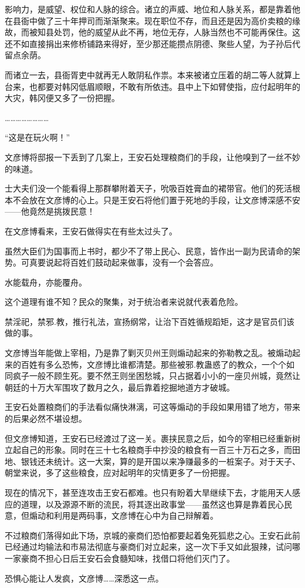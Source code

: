 影响力，是威望、权位和人脉的综合。诸立的声威、地位和人脉关系，都是靠着他在县衙中做了三十年押司而渐渐聚来。现在职位不存，而且还是因为高价卖粮的缘故，而被知县处罚，他的威望从此不再，地位无存，人脉当然也不可能再保住。这还不如直接捐出来修桥铺路来得好，至少那还能攒点阴德、聚些人望，为子孙后代留点余荫。

而诸立一去，县衙胥吏中就再无人敢阴私作祟。本来被诸立压着的胡二等人就算上台来，也都要对韩冈低眉顺眼，不敢有所依违。县中上下如臂使指，应付起明年的大灾，韩冈便又多了一份把握。

……………………

“这是在玩火啊！”

文彦博将邸报一下丢到了几案上，王安石处理粮商们的手段，让他嗅到了一丝不妙的味道。

士大夫们没一个能看得上那群攀附着天子，吮吸百姓膏血的裙带官。他们的死活根本不会放在文彦博的心上。只是王安石将他们置于死地的手段，让文彦博深感不安——他竟然是挑拨民意！

在文彦博看来，王安石做得实在有些太过头了。

虽然大臣们为国事而上书时，都少不了带上民心、民意，皆作出一副为民请命的架势。可真要说起将百姓们鼓动起来做事，没有一个会答应。

水能载舟，亦能覆舟。

这个道理有谁不知？民众的聚集，对于统治者来说就代表着危险。

禁淫祀，禁邪.教，推行礼法，宣扬纲常，让治下百姓循规蹈矩，这才是官员们该做的事。

文彦博当年能做上宰相，乃是靠了剿灭贝州王则煽动起来的弥勒教之乱。被煽动起来的百姓有多么恐怖，文彦博比谁都清楚。那些被邪.教蛊惑了的教众，一个个如同疯子一般不顾生死。要不然王则坐困愁城，只占据着小小的一座贝州城，竟然让朝廷的十万大军围攻了数月之久，最后靠着挖掘地道方才破城。

王安石处置粮商们的手法看似痛快淋漓，可这等煽动的手段如果用错了地方，带来的后果必然不堪设想。

但文彦博知道，王安石已经渡过了这一关。裹挟民意之后，如今的宰相已经重新树立起自己的形象。同时在三十七名粮商手中抄没的粮食有一百三十万石之多，而田地、银钱还未统计。这一大案，算的是开国以来净赚最多的一桩案子。对于天子、朝堂来说，多了这些粮食，应对起明年的灾情更多了一份把握。

现在的情况下，甚至连攻击王安石都难。也只有盼着大旱继续下去，才能用天人感应的道理，以及源源不断的流民，将其逐出政事堂——虽然这也算是靠着民心民意，但煽动和利用是两码事，文彦博在心中为自己辩解着。

不过粮商们落得如此下场，京城的豪商们恐怕都要起着兔死狐悲之心。王安石此前已经通过均输法和市易法彻底与豪商们对立起来，这一次下手又如此狠辣，试问哪一家豪商不担心日后王安石会食髓知味，找借口将他们灭门了。

恐惧心能让人发疯，文彦博……深悉这一点。

